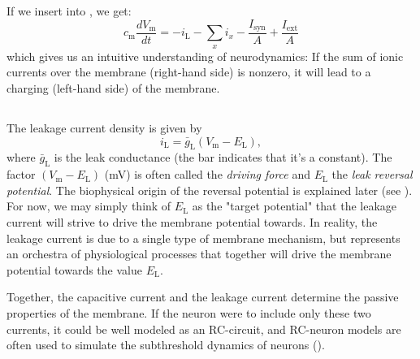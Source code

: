If we insert  into , we get:
\begin{equation}
c_{\mathrm{m}} \frac{dV_\mathrm{m}}{dt} = -  i_{\mathrm{L}} - \sum_x{i_x} - \frac{I_{\mathrm{syn}}}{A} + \frac{I_{\mathrm{ext}}}{A}
\label{eq:Neuron:singlecomp_capinserted}
\end{equation}
which gives us an intuitive understanding of neurodynamics: If the sum of ionic currents over the membrane (right-hand side) is nonzero, it will lead to a charging (left-hand side) of the membrane.


\subsection{}
\label{sec:Neuron:leak}
The leakage current density is given by
\begin{equation}
i_{\mathrm{L}} = \bar{g}_{\mathrm{L}} (V_\mathrm{m} - E_{\mathrm{L}}),
\label{eq:Neuron:HHleak}
\end{equation}
where $\bar{g}_{\mathrm{L}}$ is the leak conductance (the bar indicates that it's a constant). The factor $(V_\mathrm{m} - E_{\mathrm{L}})$ (\si{\milli\volt}) is often called the \textit{driving force} and $E_{\mathrm{L}}$ the \textit{leak reversal potential}. The biophysical origin of the reversal potential is explained later (see ). For now, we may simply think of $E_{\mathrm{L}}$ as the "target potential" that the leakage current will strive to drive the membrane potential towards. In reality, the leakage current is due to a single type of membrane mechanism, but represents an orchestra of physiological processes that together will drive the membrane potential towards the value $E_{\mathrm{L}}$. 

Together, the capacitive current and the leakage current determine the passive properties of the membrane. If the neuron were to include only these two currents, it could be well modeled as an RC-circuit, and RC-neuron models are often used to simulate the subthreshold dynamics of neurons (). 

